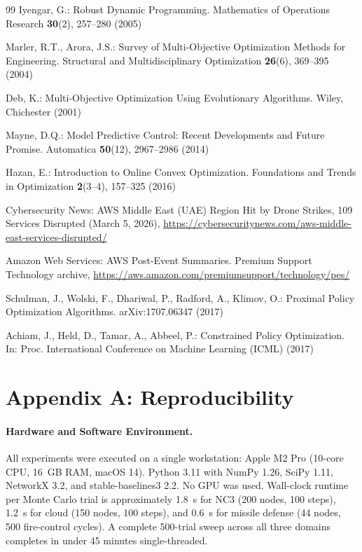 \documentclass[runningheads]{llncs}
\begin{document}
\begin{thebibliography}{99}
 Iyengar, G.: Robust Dynamic Programming. Mathematics of Operations Research \textbf{30}(2), 257--280 (2005)

 Marler, R.T., Arora, J.S.: Survey of Multi-Objective Optimization Methods for Engineering. Structural and Multidisciplinary Optimization \textbf{26}(6), 369--395 (2004)

 Deb, K.: Multi-Objective Optimization Using Evolutionary Algorithms. Wiley, Chichester (2001)

 Mayne, D.Q.: Model Predictive Control: Recent Developments and Future Promise. Automatica \textbf{50}(12), 2967--2986 (2014)

 Hazan, E.: Introduction to Online Convex Optimization. Foundations and Trends in Optimization \textbf{2}(3--4), 157--325 (2016)

 Cybersecurity News: AWS Middle East (UAE) Region Hit by Drone Strikes, 109 Services Disrupted (March 5, 2026), \url{https://cybersecuritynews.com/aws-middle-east-services-disrupted/}

 Amazon Web Services: AWS Post-Event Summaries. Premium Support Technology archive, \url{https://aws.amazon.com/premiumsupport/technology/pes/}

 Schulman, J., Wolski, F., Dhariwal, P., Radford, A., Klimov, O.: Proximal Policy Optimization Algorithms. arXiv:1707.06347 (2017)

 Achiam, J., Held, D., Tamar, A., Abbeel, P.: Constrained Policy Optimization. In: Proc. International Conference on Machine Learning (ICML) (2017)

\end{thebibliography}

\appendix

\section*{Appendix A: Reproducibility}
\label{app:reproducibility}

\paragraph{Hardware and Software Environment.}
All experiments were executed on a single workstation: Apple M2 Pro (10-core CPU, 16~GB RAM, macOS 14). Python 3.11 with NumPy 1.26, SciPy 1.11, NetworkX 3.2, and stable-baselines3 2.2. No GPU was used. Wall-clock runtime per Monte Carlo trial is approximately 1.8~s for NC3 (200 nodes, 100 steps), 1.2~s for cloud (150 nodes, 100 steps), and 0.6~s for missile defense (44 nodes, 500 fire-control cycles). A complete 500-trial sweep across all three domains completes in under 45 minutes single-threaded.
\end{document}
